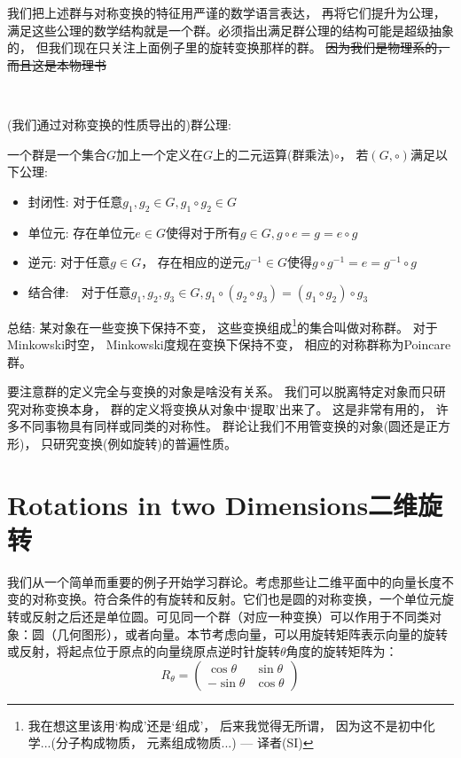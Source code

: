 我们把上述群与对称变换的特征用严谨的数学语言表达， 再将它们提升为公理， 满足这些公理的数学结构就是一个群。必须指出满足群公理的结构可能是超级抽象的， 但我们现在只关注上面例子里的旋转变换那样的群。 \sout{因为我们是物理系的， 而且这是本物理书}

\

(我们通过对称变换的性质导出的)群公理:

一个群是一个集合$G$加上一个定义在$G$上的二元运算(群乘法)$\circ$， 若$(G, \circ)$满足以下公理:
\begin{itemize}
	\item 封闭性: 对于任意$g_1, g_2 \in G, g_1 \circ g_2 \in G$

	\item 单位元: 存在单位元$e \in G$使得对于所有$g \in G, g\circ e = g = e \circ g$

	\item 逆元: 对于任意$g \in G$， 存在相应的逆元$g^{-1} \in G$使得$g \circ g^{-1} = e = g^{-1} \circ g$

	\item 结合律:　对于任意$g_1, g_2, g_3 \in G, g_1 \circ (g_2 \circ g_3) = (g_1 \circ g_2) \circ g_3$
\end{itemize}

总结: 某对象在一些变换下保持不变， 这些变换组成\footnote{我在想这里该用`构成'还是`组成'， 后来我觉得无所谓， 因为这不是初中化学...(分子构成物质， 元素组成物质...) --- 译者(SI)}的集合叫做对称群。 对于Minkowski时空， Minkowski度规在变换下保持不变， 相应的对称群称为Poincare群。

要注意群的定义完全与变换的对象是啥没有关系。 我们可以脱离特定对象而只研究对称变换本身， 群的定义将变换从对象中`提取'出来了。 这是非常有用的， 许多不同事物具有同样或同类的对称性。 群论让我们不用管变换的对象(圆还是正方形)， 只研究变换(例如旋转)的普遍性质。


\section[二维旋转]{Rotations in two Dimensions\quad 二维旋转}
\label{sec3.2}
我们从一个简单而重要的例子开始学习群论。考虑那些让二维平面中的向量长度不变的对称变换。符合条件的有旋转和反射。它们也是圆的对称变换，一个单位元旋转或反射之后还是单位圆。可见同一个群（对应一种变换）可以作用于不同类对象：圆（几何图形），或者向量。本节考虑向量，可以用旋转矩阵表示向量的旋转或反射，将起点位于原点的向量绕原点逆时针旋转$\theta$角度的旋转矩阵为：
\begin{equation}
\label{equ3.3}
R_\theta =
	\begin{pmatrix}
		\cos \theta & \sin \theta \\
		-\sin \theta & \cos \theta
	\end{pmatrix}
\end{equation}

